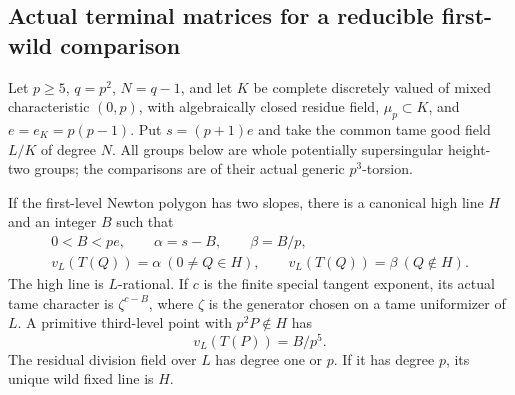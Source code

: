 \subsection{Actual terminal matrices for a reducible first-wild comparison}

Let \(p\ge5\), \(q=p^2\), \(N=q-1\), and let \(K\) be complete
discretely valued of mixed characteristic \((0,p)\), with
algebraically closed residue field, \(\mu_p\subset K\), and
\(e=e_K=p(p-1)\). Put \(s=(p+1)e\) and take the common
tame good field \(L/K\) of degree \(N\). All groups below
are whole potentially supersingular height-two groups; the
comparisons are of their actual generic \(p^3\)-torsion.

\begin{lemma}
\label{lem:B-RD82-Newton}
If the first-level Newton polygon has two slopes, there is a
canonical high line \(H\) and an integer \(B\) such that
\[
 \begin{gathered}
 0<B<pe,\qquad \alpha=s-B,\qquad \beta=B/p,\\
 v_L(T(Q))=\alpha\ (0\ne Q\in H),\qquad
 v_L(T(Q))=\beta\ (Q\notin H).
 \end{gathered}                                      \tag{B-RD82.1}
\]
The high line is \(L\)-rational. If \(c\) is the finite
special tangent exponent, its actual tame character is
\(\zeta^{c-B}\), where \(\zeta\) is the generator chosen
on a tame uniformizer of \(L\). A primitive third-level
point with \(p^2P\notin H\) has
\[
                    v_L(T(P))=B/p^5.                 \tag{B-RD82.2}
\]
The residual division field over \(L\) has degree one or
\(p\). If it has degree \(p\), its unique wild fixed line
is \(H\).
\end{lemma}
